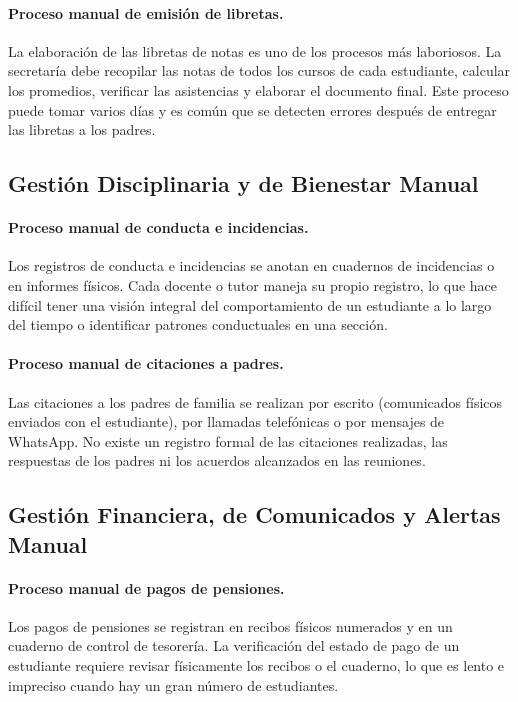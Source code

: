 \documentclass[12pt,a4paper,oneside]{report}
\begin{document}
\paragraph{Proceso manual de emisión de libretas.} La elaboración de las libretas de notas es uno de los procesos más laboriosos. La secretaría debe recopilar las notas de todos los cursos de cada estudiante, calcular los promedios, verificar las asistencias y elaborar el documento final. Este proceso puede tomar varios días y es común que se detecten errores después de entregar las libretas a los padres.

\subsection{Gestión Disciplinaria y de Bienestar Manual}

\paragraph{Proceso manual de conducta e incidencias.} Los registros de conducta e incidencias se anotan en cuadernos de incidencias o en informes físicos. Cada docente o tutor maneja su propio registro, lo que hace difícil tener una visión integral del comportamiento de un estudiante a lo largo del tiempo o identificar patrones conductuales en una sección.

\paragraph{Proceso manual de citaciones a padres.} Las citaciones a los padres de familia se realizan por escrito (comunicados físicos enviados con el estudiante), por llamadas telefónicas o por mensajes de WhatsApp. No existe un registro formal de las citaciones realizadas, las respuestas de los padres ni los acuerdos alcanzados en las reuniones.

\subsection{Gestión Financiera, de Comunicados y Alertas Manual}

\paragraph{Proceso manual de pagos de pensiones.} Los pagos de pensiones se registran en recibos físicos numerados y en un cuaderno de control de tesorería. La verificación del estado de pago de un estudiante requiere revisar físicamente los recibos o el cuaderno, lo que es lento e impreciso cuando hay un gran número de estudiantes.
\end{document}
